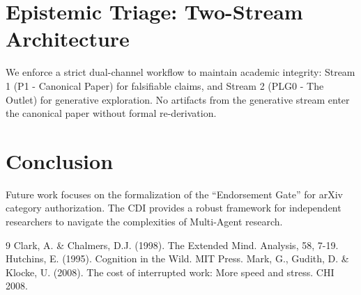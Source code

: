 \documentclass{article}
\begin{document}
\section{Epistemic Triage: Two-Stream Architecture}
We enforce a strict dual-channel workflow to maintain academic integrity: Stream 1 (P1 - Canonical Paper) for falsifiable claims, and Stream 2 (PLG0 - The Outlet) for generative exploration. No artifacts from the generative stream enter the canonical paper without formal re-derivation.

\section{Conclusion}
Future work focuses on the formalization of the ``Endorsement Gate'' for arXiv category authorization. The CDI provides a robust framework for independent researchers to navigate the complexities of Multi-Agent research.

\begin{thebibliography}{9}
 Clark, A. \& Chalmers, D.J. (1998). The Extended Mind. Analysis, 58, 7-19.
 Hutchins, E. (1995). Cognition in the Wild. MIT Press.
 Mark, G., Gudith, D. \& Klocke, U. (2008). The cost of interrupted work: More speed and stress. CHI 2008.
\end{thebibliography}
\end{document}
